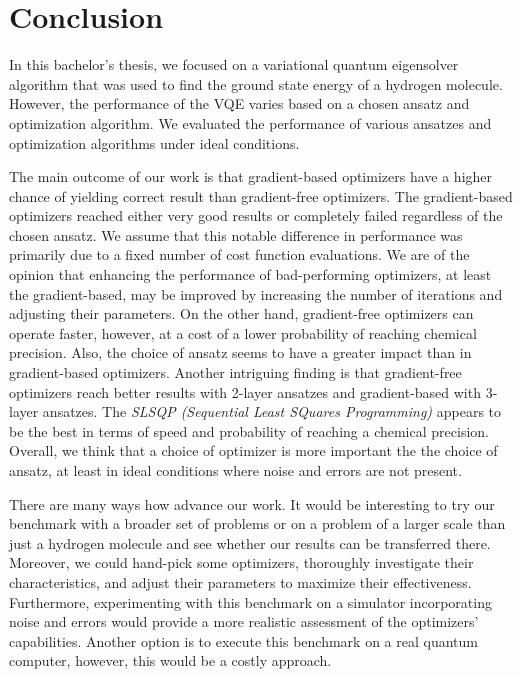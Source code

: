 \chapter*{Conclusion}

In this bachelor's thesis, we focused on a variational quantum eigensolver algorithm that was used to find the ground state energy of a hydrogen molecule. However, the performance of the VQE varies based on a chosen ansatz and optimization algorithm. We evaluated the performance of various ansatzes and optimization algorithms under ideal conditions.

The main outcome of our work is that gradient-based optimizers have a higher chance of yielding correct result than gradient-free optimizers. The gradient-based optimizers reached either very good results or completely failed regardless of the chosen ansatz. We assume that this notable difference in performance was primarily due to a fixed number of cost function evaluations. We are of the opinion that enhancing the performance of bad-performing optimizers, at least the gradient-based, may be improved by increasing the number of iterations and adjusting their parameters. On the other hand, gradient-free optimizers can operate faster, however, at a cost of a lower probability of reaching chemical precision. Also, the choice of ansatz seems to have a greater impact than in gradient-based optimizers. Another intriguing finding is that gradient-free optimizers reach better results with 2-layer ansatzes and gradient-based with 3-layer ansatzes. The \textit{SLSQP (Sequential Least SQuares Programming)} appears to be the best in terms of speed and probability of reaching a chemical precision. Overall, we think that a choice of optimizer is more important the the choice of ansatz, at least in ideal conditions where noise and errors are not present.

There are many ways how advance our work. It would be interesting to try our benchmark with a broader set of problems or on a problem of a larger scale than just a hydrogen molecule and see whether our results can be transferred there. Moreover, we could hand-pick some optimizers, thoroughly investigate their characteristics, and adjust their parameters to maximize their effectiveness. Furthermore, experimenting with this benchmark on a simulator incorporating noise and errors would provide a more realistic assessment of the optimizers' capabilities. Another option is to execute this benchmark on a real quantum computer, however, this would be a costly approach.